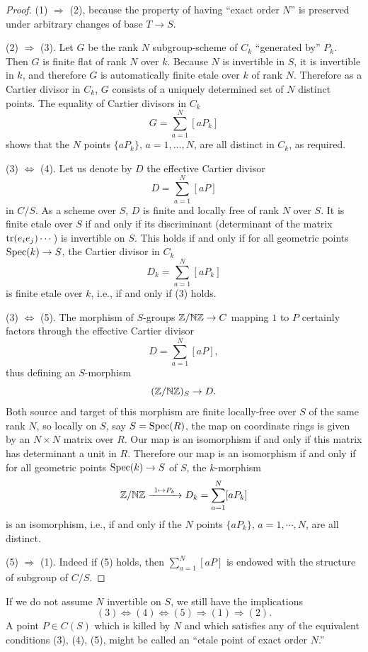 \begin{proof}
(1) $\Rightarrow$ (2), because the property of having ``exact order $N$'' is preserved under arbitrary changes of base $T \to S$.

(2) $\Rightarrow$ (3). Let $G$ be the rank $N$ subgroup-scheme of $C_k$ ``generated by'' $P_k$. Then $G$ is finite flat of rank $N$ over $k$. Because $N$ is invertible in $S$, it is invertible in $k$, and therefore $G$ is automatically finite etale over $k$ of rank $N$. Therefore as a Cartier divisor in $C_k$, $G$ consists of a uniquely determined set of $N$ distinct points. The equality of Cartier divisors in $C_k$
\[
G = \sum_{a=1}^{N} [aP_k]
\]
shows that the $N$ points $\{aP_k\}$, $a = 1, \ldots, N$, are all distinct in $C_k$, as required.

(3) $\Leftrightarrow$ (4). Let us denote by $D$ the effective Cartier divisor
\[
D = \sum_{a=1}^{N} [aP]
\]
in $C/S$. As a scheme over $S$, $D$ is finite and locally free of rank $N$ over $S$. It is finite etale over $S$ if and only if its discriminant (determinant of the matrix $\operatorname{tr}(e_i e_j)\cdots$) is invertible on $S$. This holds if and only if for all geometric points $\operatorname{Spec}(k) \to S$, the Cartier divisor in $C_k$
\[
D_k = \sum_{a=1}^{N} [aP_k]
\]
is finite etale over $k$, i.e., if and only if (3) holds.

(3) $\Leftrightarrow$ (5). The morphism of $S$-groups $\mathbb{Z}/\mathbb{N}\mathbb{Z} \to C$ mapping $1$ to $P$ certainly factors through the effective Cartier divisor
\[
D = \sum_{a=1}^{N} [aP],
\]
thus defining an $S$-morphism
\[
(\mathbb{Z}/\mathbb{N}\mathbb{Z})_S \to D.
\]
Both source and target of this morphism are finite locally-free over $S$ of the same rank $N$, so locally on $S$, say $S = \operatorname{Spec}(R)$, the map on coordinate rings is given by an $N \times N$ matrix over $R$. Our map is an isomorphism if and only if this matrix has determinant a unit in $R$. Therefore our map is an isomorphism if and only if for all geometric points $\operatorname{Spec}(k) \to S$ of $S$, the $k$-morphism
\[
\mathbb{Z}/\mathbb{N}\mathbb{Z} \xrightarrow{\ 1 \mapsto P_k\ } D_k = \sum_{a=1}^{N} [aP_k]
\]
is an isomorphism, i.e., if and only if the $N$ points $\{aP_k\}$, $a = 1, \cdots, N$, are all distinct.

(5) $\Rightarrow$ (1). Indeed if (5) holds, then $\sum_{a=1}^{N} [aP]$ is endowed with the structure of subgroup of $C/S$.
\end{proof}

\begin{remark}\label{rem:1.4.5}
If we do not assume $N$ invertible on $S$, we still have the implications
\[
(3) \Longleftrightarrow (4) \Longleftrightarrow (5) \Longrightarrow (1) \Longrightarrow (2).
\]
A point $P \in C(S)$ which is killed by $N$ and which satisfies any of the equivalent conditions (3), (4), (5), might be called an ``etale point of exact order $N$.''
\end{remark}

